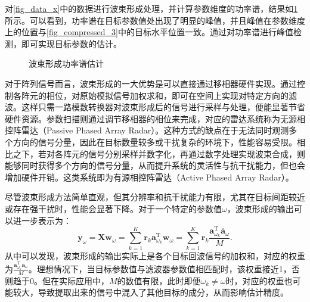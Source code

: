 对\cref{fig_data_x}中的数据进行波束形成处理，并计算参数维度的功率谱，结果如\cref{fig_spectrum_cbf}所示。可以看到，功率谱在目标参数值处出现了明显的峰值，并且峰值在参数维度上的位置与\cref{fig_compressed_3}中的目标水平位置一致。通过对功率谱进行峰值检测，即可实现目标参数的估计。

\begin{figure}[htb!]
    \centering
    \caption{波束形成功率谱估计}
    \label{fig_spectrum_cbf}
\end{figure}

对于阵列信号而言，波束形成的一大优势是可以直接通过移相器硬件实现。通过控制各阵元的相位，对原始模拟信号加权求和，即可在空间上实现对特定方向的滤波。这样只需一路模数转换器对波束形成后的信号进行采样与处理，便能显著节省硬件资源。参数扫描则通过调节移相器的相位来完成，对应的雷达系统称为无源相控阵雷达（Passive Phased Array Radar）。这种方式的缺点在于无法同时观测多个方向的信号分量，因此在目标数量较多或干扰复杂的环境下，性能容易受限。相比之下，若对各阵元的信号分别采样并数字化，再通过数字处理实现波束合成，则能够同时获得多个方向的信号分量，从而提升系统的灵活性与抗干扰能力，但也会增加硬件开销。这类系统即为有源相控阵雷达（Active Phased Array Radar）。

尽管波束形成方法简单直观，但其分辨率和抗干扰能力有限，尤其在目标间距较近或存在强干扰时，性能会显著下降。对于一个特定的参数值\( \omega \)，波束形成的输出可以进一步表示为：
\[
    \bm{y}_{\omega} = \mathbf{X} \bm{w}_{\omega} = \sum_{k=1}^{K} \bm{r}_k \bm{a}_{\omega_k}^{\mathrm{T}} \bm{w}_{\omega} = \sum_{k=1}^{K} \bm{r}_k \frac{\bm{a}_{\omega_k}^{\mathrm{T}} \overline{\bm{a}}_{\omega}}{M}.
\]
从中可以发现，波束形成的输出实际上是各个目标回波信号的加权和，对应的权重为\( \frac{\bm{a}_{\omega_k}^{\mathrm{T}} \overline{\bm{a}}_{\omega}}{M} \)。理想情况下，当目标参数值与滤波器参数值相匹配时，该权重接近1，否则趋于0。但在实际应用中，\( M \)的数值有限，此时即便\( \omega_k \neq \omega \)时，对应的权重也可能较大，导致提取出来的信号中混入了其他目标的成分，从而影响估计精度。

